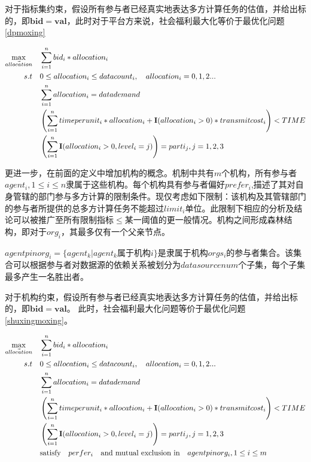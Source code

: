 \documentclass[promaster]{thesis-uestc}
\begin{document}
对于指标集约束，假设所有参与者已经真实地表达多方计算任务的估值，并给出标的，即$\mathbf{bid} = \mathbf{val}$，此时对于平台方来说，社会福利最大化等价于最优化问题\ref{dpmoxing}

\begin{align}
    \label{dpmoxing}\max_{\vec{allocation}} \quad&\sum_{i=1}^{n}{bid_i*allocation_i}\\
    s.t\quad& 0\leq allocation_i\leq datacount_i,\quad allocation_i = {0,1,2...}\notag\\
        \quad& \sum_{i=1}^{n}{allocation_i} = datademand\notag\\
        \quad& \left(\sum_{i=1}^{n}{timeperunit_i*allocation_i+\mathbf{I}(allocation_i > 0)*transmitcost_i}\right) < TIME\notag\\
        \quad& \left(\sum_{i=1}^{n}{\mathbf{I}(allocation_i > 0,level_i = j)}\right)=parti_j, j = {1,2,3}\notag
\end{align}

更进一步，在前面的定义中增加机构的概念。机制中共有$m$个机构，所有参与者$agent_i,1 \leq i \leq n$隶属于这些机构。每个机构具有参与者偏好$prefer_i$,描述了其对自身管辖的部门参与多方计算的限制条件。现仅考虑如下限制：该机构及其管辖部门的参与者所提供的总多方计算任务不能超过$limit_i$单位。此限制下相应的分析及结论可以被推广至所有限制指标$\leq$某一阈值的更一般情况。机构之间形成森林结构，即对于$org_i$，其最多仅有一个父亲节点。

$agentpinorg_i=\{agent_k|agent_k属于机构i\}$是隶属于机构$orgs_i$的参与者集合。该集合可以根据参与者对数据源的依赖关系被划分为$datasourcenum$个子集，每个子集最多产生一名胜出者。

对于机构约束，假设所有参与者已经真实地表达多方计算任务的估值，并给出标的，即$\mathbf{bid} = \mathbf{val}$。 此时，社会福利最大化问题等价于最优化问题\ref{shuxingmoxing}。

\begin{align}
    \label{shuxingmoxing}\max_{\vec{allocation}} \quad&\sum_{i=1}^{n}{bid_i*allocation_i}\\
    s.t\quad& 0\leq allocation_i\leq datacount_i,\quad allocation_i = {0,1,2...}\notag\\
        \quad& \sum_{i=1}^{n}{allocation_i} = datademand\notag\\
        \quad& \left(\sum_{i=1}^{n}{timeperunit_i*allocation_i+\mathbf{I}(allocation_i > 0)*transmitcost_i}\right) < TIME\notag\\
        \quad& \left(\sum_{i=1}^{n}{\mathbf{I}(allocation_i > 0,level_i = j)}\right)=parti_j, j = {1,2,3}\notag\\
        \quad& \text{satisfy}\quad perfer_i \quad \text{and mutual exclusion in}\quad agentpinorg_i, 1\leq i\leq m \notag
\end{align}
\end{document}
